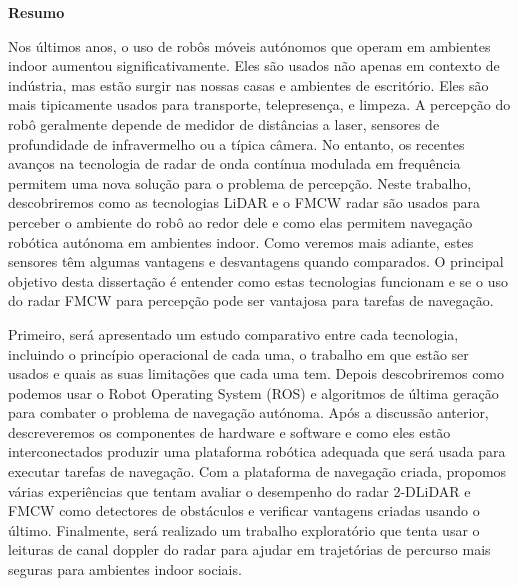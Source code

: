 \TitlePage
  \vspace*{55mm}
  \TEXT{}
        {\textbf{Resumo}}
       {Nos últimos anos, o uso de robôs móveis autónomos que operam em ambientes indoor aumentou significativamente. Eles são usados não apenas
        em contexto de indústria, mas estão surgir nas nossas casas e ambientes de escritório. Eles são mais tipicamente usados para transporte, telepresença,
        e limpeza. A percepção do robô geralmente depende de medidor de distâncias a laser, sensores de profundidade de infravermelho ou a típica câmera. No entanto, os recentes avanços na tecnologia de radar de onda contínua modulada em frequência permitem uma nova solução para o problema de percepção. Neste trabalho, descobriremos como  as tecnologias \ac{LiDAR} e o \ac{FMCW} \ac{radar} são usados para perceber o ambiente do robô ao redor dele e como elas permitem  navegação robótica autónoma em ambientes indoor. Como veremos mais adiante, estes sensores têm algumas vantagens e desvantagens quando comparados. O principal objetivo desta dissertação é
        entender como estas tecnologias funcionam e se o uso do radar FMCW para
        percepção pode ser vantajosa para tarefas de navegação.
       
       }
       \TEXT{}
       { Primeiro, será apresentado um estudo comparativo entre cada tecnologia, incluindo o princípio operacional de cada uma, o trabalho em que estão ser usados e quais as suas limitações que cada uma tem. Depois descobriremos como podemos usar o Robot Operating
        System (ROS) e algoritmos de última geração para combater o problema de navegação autónoma. Após a discussão anterior, descreveremos
        os componentes de hardware e software e como eles estão interconectados
        produzir uma plataforma robótica adequada que será usada para executar tarefas de navegação.
        Com a plataforma de navegação criada, propomos várias experiências que
        tentam avaliar o desempenho do radar 2-DLiDAR e FMCW como
        detectores de obstáculos e verificar vantagens criadas usando o
        último. Finalmente, será realizado um trabalho exploratório que tenta usar o
        leituras de canal doppler do radar para ajudar em trajetórias de percurso mais seguras para ambientes indoor sociais}.
       \TEXT{}     
       {%
       }
 
